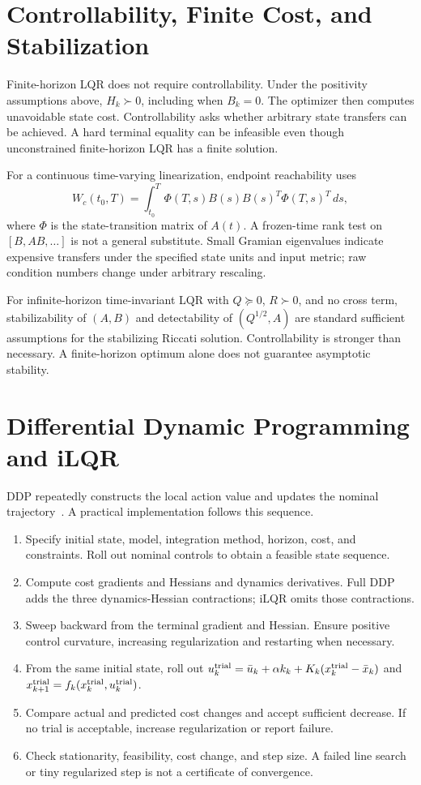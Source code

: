 \section{Controllability, Finite Cost, and Stabilization}

Finite-horizon LQR does not require controllability. Under the positivity
assumptions above, $H_k\succ0$, including when $B_k=0$. The optimizer then
computes unavoidable state cost. Controllability asks whether arbitrary state
transfers can be achieved. A hard terminal equality can be infeasible even
though unconstrained finite-horizon LQR has a finite solution.

For a continuous time-varying linearization, endpoint reachability uses
\begin{equation}
W_c(t_0,T)=\int_{t_0}^T\Phi(T,s)B(s)B(s)^T\Phi(T,s)^T\,ds,
\end{equation}
where $\Phi$ is the state-transition matrix of $A(t)$. A frozen-time rank
test on $[B,AB,\ldots]$ is not a general substitute. Small Gramian eigenvalues
indicate expensive transfers under the specified state units and input metric;
raw condition numbers change under arbitrary rescaling.

For infinite-horizon time-invariant LQR with $Q\succeq0$, $R\succ0$, and
no cross term, stabilizability of $(A,B)$ and detectability of $(Q^{1/2},A)$
are standard sufficient assumptions for the stabilizing Riccati solution.
Controllability is stronger than necessary. A finite-horizon optimum alone
does not guarantee asymptotic stability.

\section{Differential Dynamic Programming and iLQR}
\label{sec:ch5:ilqr-vs-ddp}

DDP repeatedly constructs the local action value and updates the nominal
trajectory~\cite{jacobson1970dpp}. A practical implementation follows this sequence.
\begin{enumerate}
\item Specify initial state, model, integration method, horizon, cost, and
constraints. Roll out nominal controls to obtain a feasible state sequence.
\item Compute cost gradients and Hessians and dynamics derivatives. Full DDP
adds the three dynamics-Hessian contractions; iLQR omits those contractions.
\item Sweep backward from the terminal gradient and Hessian. Ensure positive
control curvature, increasing regularization and restarting when necessary.
\item From the same initial state, roll out
$u_k^{\rm trial}=\bar u_k+\alpha k_k+K_k(x_k^{\rm trial}-\bar x_k)$ and
$x_{k+1}^{\rm trial}=f_k(x_k^{\rm trial},u_k^{\rm trial})$.
\item Compare actual and predicted cost changes and accept sufficient decrease.
If no trial is acceptable, increase regularization or report failure.
\item Check stationarity, feasibility, cost change, and step size. A failed
line search or tiny regularized step is not a certificate of convergence.
\end{enumerate}

